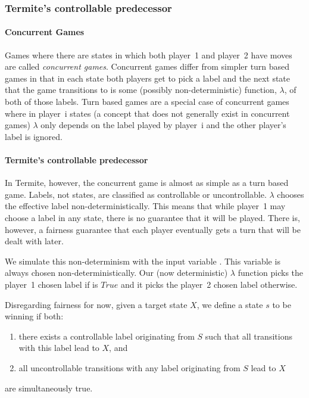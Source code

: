 \subsubsection{Termite's controllable predecessor}

\paragraph{Concurrent Games}

Games where there are states in which both player~1 and player~2 have moves are called \emph{concurrent games}. Concurrent games differ from simpler turn based games in that in each state both players get to pick a label and the next state that the game transitions to is some (possibly non-deterministic) function, $\lambda$, of both of those labels. Turn based games are a special case of concurrent games where in player~i states (a concept that does not generally exist in concurrent games) $\lambda$ only depends on the label played by player~i and the other player's label is ignored. 

\paragraph{Termite's controllable predecessor}

In Termite, however, the concurrent game is almost as simple as a turn based game. Labels, not states, are classified as controllable or uncontrollable. $\lambda$ chooses the effective label non-deterministically. This means that while player~1 may choose a label in any state, there is no guarantee that it will be played. There is, however, a fairness guarantee that each player eventually gets a turn that will be dealt with later.

We simulate this non-determinism with the input variable . This variable is always chosen non-deterministically. Our (now deterministic) $\lambda$ function picks the player~1 chosen label if  is $True$ and it picks the player~2 chosen label otherwise.

Disregarding fairness for now, given a target state $X$, we define a state $s$ to be winning if both:
\begin{enumerate}
    \item there exists a controllable label originating from $S$ such that all transitions with this label lead to $X$, and
    \item all uncontrollable transitions with any label originating from $S$ lead to $X$
\end{enumerate}
\noindent are simultaneously true. 

